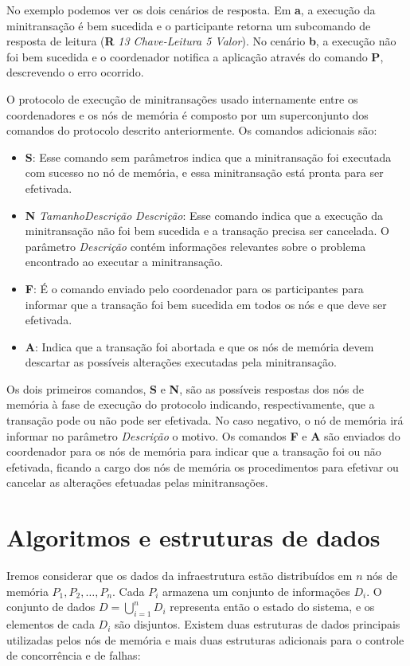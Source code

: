 \documentclass[11pt,twoside,a4paper]{book}
\begin{document}
No exemplo podemos ver os dois cenários de resposta. Em \textbf{a}, a execução da minitransação é bem sucedida e o participante retorna um subcomando de resposta de leitura (\textbf{R} \textit{13 Chave-Leitura 5 Valor}). 
No cenário \textbf{b}, a execução não foi bem sucedida e o coordenador notifica a aplicação através do comando \textbf{P}, descrevendo o erro ocorrido.

O protocolo de execução de minitransações usado internamente entre os coordenadores e os nós de memória é composto por um superconjunto dos comandos do protocolo descrito anteriormente. Os comandos adicionais são:

\begin{itemize}
    \item \textbf{S}: Esse comando sem parâmetros indica que a minitransação foi executada com sucesso no nó de memória, e essa minitransação está pronta para ser efetivada.

    \item \textbf{N} \textit{TamanhoDescrição} \textit{Descrição}: Esse comando indica que a execução da minitransação não foi bem sucedida e a transação precisa ser cancelada. O parâmetro \textit{Descrição} contém informações relevantes sobre o problema encontrado ao executar a minitransação.

    \item \textbf{F}: É o comando enviado pelo coordenador para os participantes para informar que a transação foi bem sucedida em todos os nós e que deve ser efetivada.

    \item \textbf{A}: Indica que a transação foi abortada e que os nós de memória devem descartar as possíveis alterações executadas pela minitransação.
\end{itemize}

Os dois primeiros comandos, \textbf{S} e \textbf{N}, são as possíveis respostas dos nós de memória à fase de execução do protocolo indicando, respectivamente, que a transação pode ou não pode ser efetivada. No caso negativo, o nó de memória irá informar no parâmetro \textit{Descrição} o motivo. Os comandos \textbf{F} e \textbf{A} são enviados do coordenador para os nós de memória para indicar que a transação foi ou não efetivada, ficando a cargo dos nós de memória os procedimentos para efetivar ou cancelar as alterações efetuadas pelas minitransações.

\section{Algoritmos e estruturas de dados}
\label{sec:algoritmos}
Iremos considerar que os dados da infraestrutura estão distribuídos em $n$ nós de memória $P_1, P_2, \dotsc, P_n$. Cada $P_i$ armazena um conjunto de informações $D_i$. O conjunto de dados $D = \bigcup_{i=1}^n D_i$ representa então o estado do sistema, e os elementos de cada $D_i$ são disjuntos. Existem duas estruturas de dados principais utilizadas pelos nós de memória e mais duas estruturas adicionais para o controle de concorrência e de falhas:
\end{document}
